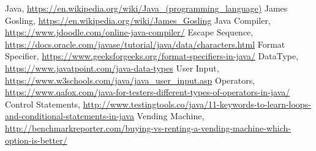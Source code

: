 \documentclass[openany]{book}  %
\begin{document}
% 
% 
\printindex
% 
% 
\begin{thebibliography}{90}
    \footnotesize
     Java, \url{https://en.wikipedia.org/wiki/Java_(programming_language)}
     James Gosling, \url{https://en.wikipedia.org/wiki/James_Gosling}
     Java Compiler, \url{https://www.jdoodle.com/online-java-compiler/}
     Escape Sequence, \url{https://docs.oracle.com/javase/tutorial/java/data/characters.html}
     Format Specifier,  \footnotesize{\url{https://www.geeksforgeeks.org/format-specifiers-in-java/}}
     DataType, \url{https://www.javatpoint.com/java-data-types}
     User Input, \url{https://www.w3schools.com/java/java_user_input.asp}
     Operators, \url{https://www.qafox.com/java-for-testers-different-types-of-operators-in-java/}
     Control Statements, \url{http://www.testingtools.co/java/11-keywords-to-learn-loops-and-conditional-statements-in-java}
     Vending Machine, \url{http://benchmarkreporter.com/buying-vs-renting-a-vending-machine-which-option-is-better/}
\end{thebibliography}



















\end{document}
